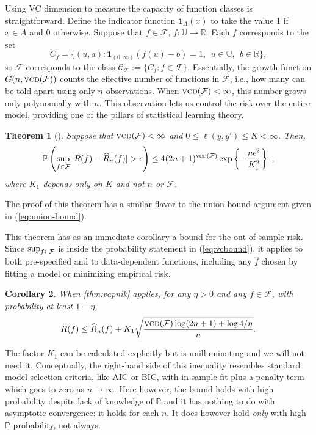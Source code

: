 \documentclass{article}
\theoremstyle{plain}
\newtheorem{theorem}{Theorem}[section]
\newtheorem{corollary}[theorem]{Corollary}
\newcommand{\F}{\mathcal{F}}
\renewcommand{\P}{\mathbb{P}}
\newcommand{\R}{\mathbb{R}}
\renewcommand{\hat}[1]{\widehat{#1}}
\DeclareMathOperator*{\vcd}{\textsc{vcd}}
\newcommand{\indicator}{\mathbf{1}}
\renewcommand{\eqref}[1]{(\ref{eq:#1})}
\begin{document}
Using VC dimension to measure the capacity of function classes is
straightforward.  Define the indicator function $\indicator_A(x)$ to take the
value 1 if $x\in A$ and 0 otherwise. Suppose that $f\in\F$,
$f:\mathbb{U}\rightarrow\R$. Each $f$ corresponds to the set
\begin{equation}
C_f = \{ (u,a) : \indicator_{(0,\infty)}(f(u)-b)=1,\ \ u\in\mathbb{U},\ \ b\in\R\},
\end{equation}
so $\F$ corresponds to the class $\mathcal{C}_\F := \{ C_f : f \in \F\}$.
Essentially, the growth function $G(n,\vcd(\F))$ counts the effective number of
functions in $\F$, i.e., how many can be told apart using only $n$
observations.  When $\vcd(\F) < \infty$, this number grows only polynomially
with $n$.  This observation lets us control the risk over the entire model,
providing one of the pillars of statistical learning theory.

\begin{theorem}
  [\citet{VapnikChervonenkis1971}]
  \label{thm:vapnik}
  Suppose that $\vcd(\F)< \infty$ and $0\leq\ell(y,y')\leq K <
  \infty$. Then, 
  \begin{equation}
    \label{eq:vcbound}
    \P \left(\sup_{f\in\F} |R(f) - \hat{R}_n(f)| > \epsilon\right)
    \leq 4(2n+1)^{\vcd(\F)} \exp \left\{ - \frac{n\epsilon^2}{K^2_1} \right\} ~,
  \end{equation}
  where $K_1$ depends only on $K$ and not $n$ or $\F$.
\end{theorem}
The proof of this theorem has a similar flavor to the union bound argument
given in \eqref{union-bound}.

This theorem has as an immediate corollary a bound for the out-of-sample
risk. Since $\sup_{f\in {\cal F}}$ is inside the probability statement in
\eqref{vcbound}, it applies to both pre-specified and to data-dependent
functions, including any $\widehat{f}$ chosen by fitting a model or minimizing
empirical risk. 
\begin{corollary}
  \label{cor:vapnik}
  When \autoref{thm:vapnik} applies, for any $\eta>0$ and any $f \in \F$, with probability at least $1-\eta$,
  \begin{equation}
  R(f) \leq \widehat{R}_n(f) + K_1\sqrt{\frac{\vcd(\F)\log(2n+1) +
      \log 4/\eta}{n}}.
  \end{equation}
\end{corollary}
The factor $K_1$ can be calculated explicitly but is unilluminating and we will not
need it.  Conceptually, the right-hand side of this inequality resembles
standard model selection criteria, like AIC or BIC, with in-sample fit plus a
penalty term which goes to zero as $n\rightarrow\infty$. Here however, the
bound holds with high probability despite lack of knowledge of $\P$ and it has
nothing to do with asymptotic convergence: it holds for each $n$.  It does
however hold {\em only} with high $\P$ probability, not always.
\end{document}
